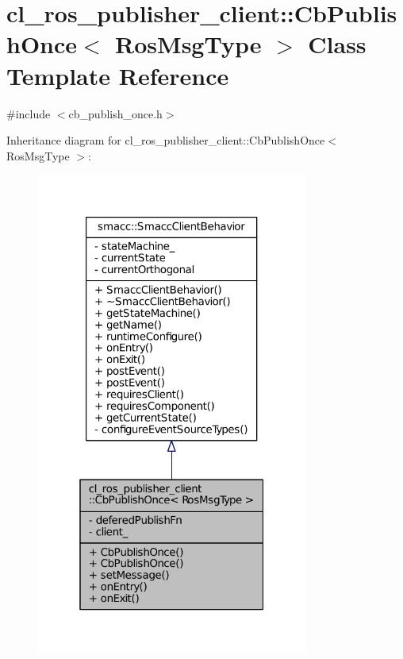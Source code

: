 \hypertarget{classcl__ros__publisher__client_1_1CbPublishOnce}{}\section{cl\+\_\+ros\+\_\+publisher\+\_\+client\+:\+:Cb\+Publish\+Once$<$ Ros\+Msg\+Type $>$ Class Template Reference}
\label{classcl__ros__publisher__client_1_1CbPublishOnce}


{\ttfamily \#include $<$cb\+\_\+publish\+\_\+once.\+h$>$}



Inheritance diagram for cl\+\_\+ros\+\_\+publisher\+\_\+client\+:\+:Cb\+Publish\+Once$<$ Ros\+Msg\+Type $>$\+:
\nopagebreak
\begin{figure}[H]
\begin{center}
\leavevmode
\includegraphics[width=253pt]{classcl__ros__publisher__client_1_1CbPublishOnce__inherit__graph}
\end{center}
\end{figure}


